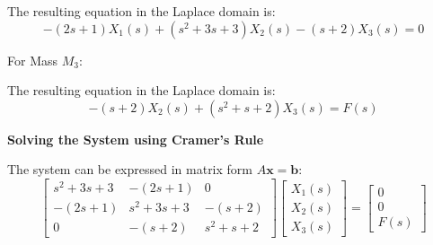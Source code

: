 \documentclass[11pt]{article}
\begin{document}
The resulting equation in the Laplace domain is:
\begin{equation}
-(2s + 1)X_1(s) + (s^2 + 3s + 3)X_2(s) - (s + 2)X_3(s) = 0 \tag{2}
\end{equation}

\newpage

\vspace{12pt}
{For Mass $M_3$:}
\begin{figure}[h!]
\centering
{}
\end{figure}

The resulting equation in the Laplace domain is:
\begin{equation}
-(s + 2)X_2(s) + (s^2 + s + 2)X_3(s) = F(s) \tag{3}
\end{equation}

\noindent\textbf{Solving the System using Cramer's Rule}
\vspace{12pt}

The system can be expressed in matrix form $A\mathbf{x} = \mathbf{b}$:
$$
\begin{bmatrix}
s^2 + 3s + 3 & -(2s + 1) & 0 \\
-(2s + 1) & s^2 + 3s + 3 & -(s + 2) \\
0 & -(s + 2) & s^2 + s + 2
\end{bmatrix}
\begin{bmatrix}
X_1(s) \\
X_2(s) \\
X_3(s)
\end{bmatrix}
=
\begin{bmatrix}
0 \\
0 \\
F(s)
\end{bmatrix}
$$
\end{document}
